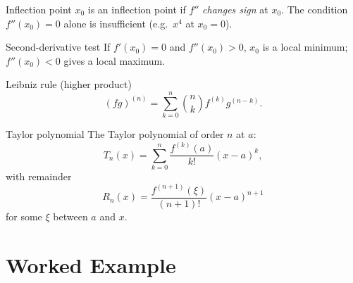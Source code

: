 \begin{rulebox}{Inflection point}
$x_{0}$ is an inflection point if $f''$ \emph{changes sign} at $x_{0}$. The
condition $f''(x_{0})=0$ alone is insufficient (e.g.\ $x^{4}$ at $x_{0}=0$).
\end{rulebox}

\begin{rulebox}{Second-derivative test}
If $f'(x_{0})=0$ and $f''(x_{0})>0$, $x_{0}$ is a local minimum;
$f''(x_{0})<0$ gives a local maximum.
\end{rulebox}

\begin{rulebox}{Leibniz rule (higher product)}
\[
  (fg)^{(n)}=\sum_{k=0}^{n}\binom{n}{k}f^{(k)}g^{(n-k)} .
\]
\end{rulebox}

\begin{rulebox}{Taylor polynomial}
The Taylor polynomial of order $n$ at $a$:
\[
  T_{n}(x)=\sum_{k=0}^{n}\frac{f^{(k)}(a)}{k!}(x-a)^{k},
\]
with remainder
\[
  R_{n}(x)=\frac{f^{(n+1)}(\xi)}{(n+1)!}(x-a)^{n+1}
\]
for some $\xi$ between $a$ and $x$.
\end{rulebox}

\section{Worked Example}

